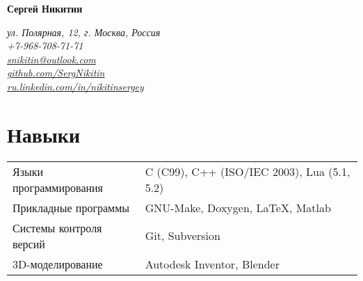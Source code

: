 \documentclass[a4paper, 11pt]{article}
\begin{document}
{\LARGE\textbf{Сергей Никитин}}

\begin{flushright}
    {\itshape
        ул. Полярная, 12, г. Москва, Россия                                                 \\
        +7-968-708-71-71                                                                    \\
        \href{mailto:snikitin@outlook.com}{snikitin@outlook.com}                            \\
        \href{https://github.com/SergNikitin}{github.com/SergNikitin}                       \\
        \href{http://ru.linkedin.com/in/nikitinsergey}{ru.linkedin.com/in/nikitinsergey}    \\
    }
\end{flushright}

\section{Навыки}
\begin{tabular}{ll}
    Языки программирования   & C (C99), C++ (ISO/IEC 2003), Lua (5.1, 5.2)  \\
    Прикладные программы     & GNU-Make, Doxygen, LaTeX, Matlab             \\
    Системы контроля версий  & Git, Subversion                              \\
    3D-моделирование         & Autodesk Inventor, Blender
\end{tabular}
\end{document}

